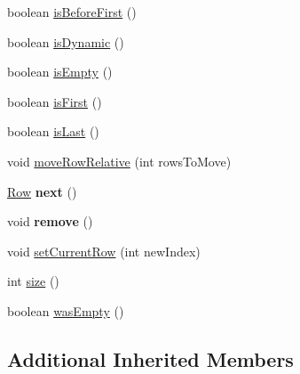 \begin{DoxyCompactItemize}
boolean \mbox{\hyperlink{classcom_1_1mysql_1_1cj_1_1protocol_1_1a_1_1result_1_1_resultset_rows_static_adbab4e5b2490a9e147a79de4cc7d6e1d}{is\+Before\+First}} ()
\item 
boolean \mbox{\hyperlink{classcom_1_1mysql_1_1cj_1_1protocol_1_1a_1_1result_1_1_resultset_rows_static_acf9221e596a879c793000246688ff8f6}{is\+Dynamic}} ()
\item 
boolean \mbox{\hyperlink{classcom_1_1mysql_1_1cj_1_1protocol_1_1a_1_1result_1_1_resultset_rows_static_a6e253f009ce83647195f60954d021cff}{is\+Empty}} ()
\item 
boolean \mbox{\hyperlink{classcom_1_1mysql_1_1cj_1_1protocol_1_1a_1_1result_1_1_resultset_rows_static_ad16947839519d3bf8c5bc679f6920b5c}{is\+First}} ()
\item 
boolean \mbox{\hyperlink{classcom_1_1mysql_1_1cj_1_1protocol_1_1a_1_1result_1_1_resultset_rows_static_a2714d5e0fe10d3cb3b148a3fb2d6fec4}{is\+Last}} ()
\item 
void \mbox{\hyperlink{classcom_1_1mysql_1_1cj_1_1protocol_1_1a_1_1result_1_1_resultset_rows_static_ac6527b7e8cbc7cb3ec0c67c854f145b7}{move\+Row\+Relative}} (int rows\+To\+Move)
\item 
\mbox{\label{classcom_1_1mysql_1_1cj_1_1protocol_1_1a_1_1result_1_1_resultset_rows_static_a98819686c338cde8d042994ebfda2345}} 
\mbox{\hyperlink{interfacecom_1_1mysql_1_1cj_1_1result_1_1_row}{Row}} {\bfseries next} ()
\item 
\mbox{\label{classcom_1_1mysql_1_1cj_1_1protocol_1_1a_1_1result_1_1_resultset_rows_static_a211c7a73662f04b4a0a47d8de92041f5}} 
void {\bfseries remove} ()
\item 
void \mbox{\hyperlink{classcom_1_1mysql_1_1cj_1_1protocol_1_1a_1_1result_1_1_resultset_rows_static_a6975dcd56b2033fcfc7dbfe7a4fa83d8}{set\+Current\+Row}} (int new\+Index)
\item 
int \mbox{\hyperlink{classcom_1_1mysql_1_1cj_1_1protocol_1_1a_1_1result_1_1_resultset_rows_static_a1063d6dd64edbd0a400922e9c371ff5f}{size}} ()
\item 
boolean \mbox{\hyperlink{classcom_1_1mysql_1_1cj_1_1protocol_1_1a_1_1result_1_1_resultset_rows_static_ad18792e2f43667c3dc0b6e41a6de3026}{was\+Empty}} ()
\end{DoxyCompactItemize}
\subsection*{Additional Inherited Members}


